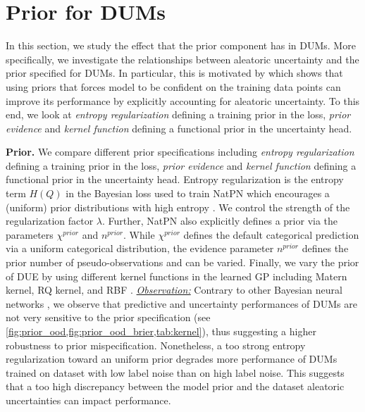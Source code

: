 \section{Prior for DUMs}
\label{sec:prior}

In this section, we study the effect that the prior component has in DUMs. More specifically, we investigate the relationships between aleatoric uncertainty and the prior specified for DUMs. In particular, this is motivated by \citet{kapoor2022prior_cpe} which shows that using priors that forces model to be confident on the training data points can improve its performance by explicitly accounting for aleatoric uncertainty.
To this end, we look at \textit{entropy regularization} defining a training prior in the loss, \textit{prior evidence} and \textit{kernel function} defining a functional prior in the uncertainty head.

\textbf{Prior.} We compare different prior specifications including \textit{entropy regularization} defining a training prior in the loss, \textit{prior evidence} and \textit{kernel function} defining a functional prior in the uncertainty head. Entropy regularization is the entropy term $H(Q)$ in the Bayesian loss used to train NatPN which encourages a (uniform) prior distributions with high entropy \citep{charpentier2022natpn}. We control the strength of the regularization factor $\lambda$. Further, NatPN also explicitly defines a prior via the parameters $\chi^{prior}$ and $n^{prior}$. While  $\chi^{prior}$ defines the default categorical prediction via a uniform categorical distribution, the evidence parameter $n^{prior}$ defines the prior number of pseudo-observations and can be varied. Finally, we vary the prior of DUE by using different kernel functions in the learned GP including Matern kernel, RQ kernel, and RBF \citep{rasmussen2006gp}. \underline{\textit{Observation:}} Contrary to other Bayesian neural networks \citep{kapoor2022prior_cpe}, we observe that predictive and uncertainty performances of DUMs are not very sensitive to the prior specification (see \cref{fig:prior_ood,fig:prior_ood_brier,tab:kernel}), thus suggesting a higher robustness to prior mispecification. Nonetheless, a too strong entropy regularization toward an uniform prior degrades more performance of DUMs trained on dataset with low label noise than on high label noise. This suggests that a too high discrepancy between the model prior and the dataset aleatoric uncertainties can impact performance.

